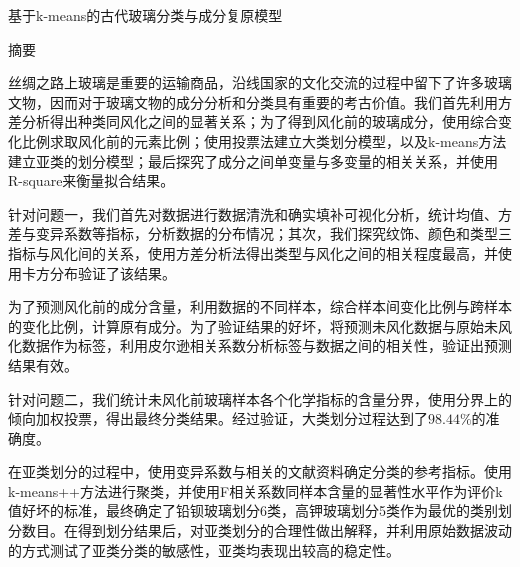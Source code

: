 \documentclass{my_paper}
\newcommand{\lunwenbiaoti}{\fontsize{15.75pt}{0}\heiti 基于k-means的古代玻璃分类与成分复原模型}
\newcommand{\zhaiyao}{\fontsize{14pt}{0}\heiti 摘要}
\begin{document}
\newpage
\begin{center}
\lunwenbiaoti

\vspace{2ex}
\zhaiyao
\end{center}

丝绸之路上玻璃是重要的运输商品，沿线国家的文化交流的过程中留下了许多玻璃文物，因而对于玻璃文物的成分分析和分类具有重要的考古价值。我们首先利用方差分析得出种类同风化之间的显著关系；为了得到风化前的玻璃成分，使用综合变化比例求取风化前的元素比例；使用投票法建立大类划分模型，以及k-means方法建立亚类的划分模型；最后探究了成分之间单变量与多变量的相关关系，并使用R-square来衡量拟合结果。

针对问题一，我们首先对数据进行数据清洗和确实填补可视化分析，统计均值、方差与变异系数等指标，分析数据的分布情况；其次，我们探究纹饰、颜色和类型三指标与风化间的关系，使用方差分析法得出类型与风化之间的相关程度最高，并使用卡方分布验证了该结果。

为了预测风化前的成分含量，利用数据的不同样本，综合样本间变化比例与跨样本的变化比例，计算原有成分。为了验证结果的好坏，将预测未风化数据与原始未风化数据作为标签，利用皮尔逊相关系数分析标签与数据之间的相关性，验证出预测结果有效。

针对问题二，我们统计未风化前玻璃样本各个化学指标的含量分界，使用分界上的倾向加权投票，得出最终分类结果。经过验证，大类划分过程达到了$98.44\%$的准确度。

在亚类划分的过程中，使用变异系数与相关的文献资料确定分类的参考指标。使用k-means++方法进行聚类，并使用F相关系数同样本含量的显著性水平作为评价k值好坏的标准，最终确定了铅钡玻璃划分6类，高钾玻璃划分5类作为最优的类别划分数目。在得到划分结果后，对亚类划分的合理性做出解释，并利用原始数据波动的方式测试了亚类分类的敏感性，亚类均表现出较高的稳定性。
\end{document}
